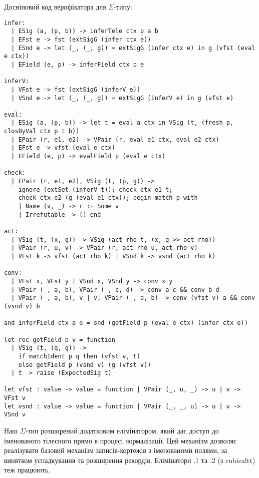 \newpage
Досніповий код верифікатора для $\Sigma$-типу:
\begin{lstlisting}
infer:
  | ESig (a, (p, b)) -> inferTele ctx p a b
  | EFst e -> fst (extSigG (infer ctx e))
  | ESnd e -> let (_, (_, g)) = extSigG (infer ctx e) in g (vfst (eval e ctx))
  | EField (e, p) -> inferField ctx p e

inferV:
  | VFst e -> fst (extSigG (inferV e))
  | VSnd e -> let (_, (_, g)) = extSigG (inferV e) in g (vfst e)

eval:
  | ESig (a, (p, b)) -> let t = eval a ctx in VSig (t, (fresh p, closByVal ctx p t b))
  | EPair (r, e1, e2) -> VPair (r, eval e1 ctx, eval e2 ctx)
  | EFst e -> vfst (eval e ctx)
  | EField (e, p) -> evalField p (eval e ctx)

check:
  | EPair (r, e1, e2), VSig (t, (p, g)) ->
    ignore (extSet (inferV t)); check ctx e1 t;
    check ctx e2 (g (eval e1 ctx)); begin match p with
    | Name (v, _) -> r := Some v
    | Irrefutable -> () end

act:
  | VSig (t, (x, g)) -> VSig (act rho t, (x, g >> act rho))
  | VPair (r, u, v) -> VPair (r, act rho u, act rho v)
  | VFst k -> vfst (act rho k) | VSnd k -> vsnd (act rho k)

conv:
  | VFst x, VFst y | VSnd x, VSnd y -> conv x y
  | VPair (_, a, b), VPair (_, c, d) -> conv a c && conv b d
  | VPair (_, a, b), v | v, VPair (_, a, b) -> conv (vfst v) a && conv (vsnd v) b

and inferField ctx p e = snd (getField p (eval e ctx) (infer ctx e))

let rec getField p v = function
  | VSig (t, (q, g)) ->
    if matchIdent p q then (vfst v, t)
    else getField p (vsnd v) (g (vfst v))
  | t -> raise (ExpectedSig t)

let vfst : value -> value = function | VPair (_, u, _) -> u | v -> VFst v
let vsnd : value -> value = function | VPair (_, _, u) -> u | v -> VSnd v
\end{lstlisting}

\newpage
Наш $\Sigma$-тип розширений додатковим елімінатором, який дає доступ до
іменованого тілесного прямо в процесі нормалізації. Цей механізм дозволяє
реалізувати базовий механізм записів-кортежів з іменованими полями,
за винятком успадкування та розширення рекордів.
Елімінатори .1 та .2 (з cubicaltt) теж працюють.

